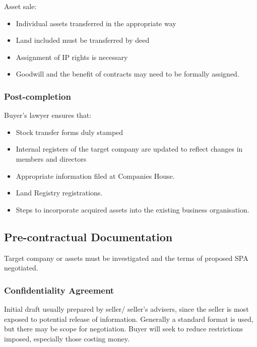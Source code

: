 \documentclass[
]{article}
\providecommand{\tightlist}{%
  \setlength{\itemsep}{0pt}\setlength{\parskip}{0pt}}
\begin{document}
Asset sale:

\begin{itemize}
\tightlist
\item
  Individual assets transferred in the appropriate way
\item
  Land included must be transferred by deed
\item
  Assignment of IP rights is necessary
\item
  Goodwill and the benefit of contracts may need to be formally
  assigned.
\end{itemize}

\hypertarget{post-completion}{%
\subsubsection{Post-completion}\label{post-completion}}

Buyer's lawyer ensures that:

\begin{itemize}
\tightlist
\item
  Stock transfer forms duly stamped
\item
  Internal registers of the target company are updated to reflect
  changes in members and directors
\item
  Appropriate information filed at Companies House.
\item
  Land Registry registrations.
\item
  Steps to incorporate acquired assets into the existing business
  organisation.
\end{itemize}

\hypertarget{pre-contractual-documentation}{%
\subsection{Pre-contractual
Documentation}\label{pre-contractual-documentation}}

Target company or assets must be investigated and the terms of proposed
SPA negotiated.

\hypertarget{confidentiality-agreement-1}{%
\subsubsection{Confidentiality
Agreement}\label{confidentiality-agreement-1}}

Initial draft usually prepared by seller/ seller's advisers, since the
seller is most exposed to potential release of information. Generally a
standard format is used, but there may be scope for negotiation. Buyer
will seek to reduce restrictions imposed, especially those costing
money.
\end{document}
